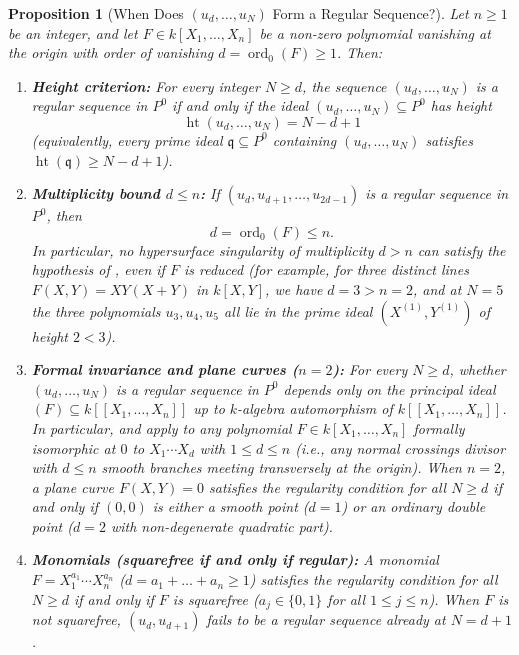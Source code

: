 \documentclass[a4paper, 12pt, reqno]{amsart}
\newtheorem{proposition}[theorem]{Proposition}
\theoremstyle{remark}
\begin{document}
\begin{proposition}[When Does $(u_d, \dots, u_N)$ Form a Regular Sequence?]
  \label{prop:regularity-criteria}
  Let $n \ge 1$ be an integer,
  and let $F \in k[X_1, \dots, X_n]$ be a non-zero polynomial vanishing at the origin with order of vanishing $d = \operatorname{ord}_0(F) \ge 1$.
  Then:
  \begin{enumerate}
  \item \textbf{Height criterion:}
    For every integer $N \ge d$,
    the sequence $(u_d, \dots, u_N)$ is a regular sequence in $P^0$ if and only if the ideal $(u_d, \dots, u_N) \subseteq P^0$ has height
    \begin{equation}
      \label{eq:reg-seq-height-criterion}
      \operatorname{ht}(u_d, \dots, u_N) = N - d + 1
    \end{equation}
    (equivalently, every prime ideal $\mathfrak{q} \subseteq P^0$ containing $(u_d, \dots, u_N)$ satisfies $\operatorname{ht}(\mathfrak{q}) \ge N - d + 1$).

  \item \textbf{Multiplicity bound $d \le n$:}
    If $(u_d, u_{d + 1}, \dots, u_{2d - 1})$ is a regular sequence in $P^0$,
    then
    \begin{equation*}
      d = \operatorname{ord}_0(F) \le n.
    \end{equation*}
    In particular,
    no hypersurface singularity of multiplicity $d > n$ can satisfy the hypothesis of ,
    even if $F$ is reduced
    (for example, for three distinct lines $F(X, Y) = X Y (X + Y)$ in $k[X, Y]$, we have $d = 3 > n = 2$, and at $N = 5$ the three polynomials $u_3, u_4, u_5$ all lie in the prime ideal $(X^{(1)}, Y^{(1)})$ of height $2 < 3$).

  \item \textbf{Formal invariance and plane curves ($n = 2$):}
    For every $N \ge d$,
    whether $(u_d, \dots, u_N)$ is a regular sequence in $P^0$ depends only on the principal ideal $(F) \subseteq k[[X_1, \dots, X_n]]$ up to $k$-algebra automorphism of $k[[X_1, \dots, X_n]]$.
    In particular,
     and  apply to any polynomial $F \in k[X_1, \dots, X_n]$ formally isomorphic at $0$ to $X_1 \cdots X_d$ with $1 \le d \le n$
    (i.e., any normal crossings divisor with $d \le n$ smooth branches meeting transversely at the origin).
    When $n = 2$,
    a plane curve $F(X, Y) = 0$ satisfies the regularity condition for all $N \ge d$ if and only if $(0, 0)$ is either a smooth point ($d = 1$) or an ordinary double point ($d = 2$ with non-degenerate quadratic part).

  \item \textbf{Monomials (squarefree if and only if regular):}
    A monomial $F = X_1^{a_1} \cdots X_n^{a_n}$ ($d = a_1 + \dots + a_n \ge 1$) satisfies the regularity condition for all $N \ge d$ if and only if $F$ is squarefree ($a_j \in \{0, 1\}$ for all $1 \le j \le n$).
    When $F$ is not squarefree,
    $(u_d, u_{d + 1})$ fails to be a regular sequence already at $N = d + 1$.
  \end{enumerate}
\end{proposition}
\end{document}
